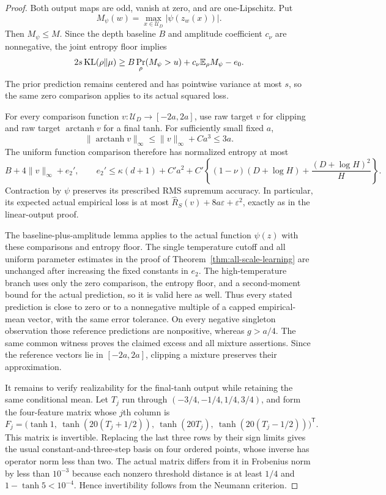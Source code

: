 \begin{proof}
Both output maps are odd, vanish at zero, and are one-Lipschitz. Put
\[
 M_\psi(w)=\max_{x\in\mathcal U_D}|\psi(z_w(x))|.
\]
Then $M_\psi\le M$. Since the depth baseline $B$ and amplitude coefficient $c_\nu$ are nonnegative, the joint entropy floor implies
\[
 2s\operatorname{KL}(\rho\|\mu)
 \ge B\Pr_\rho(M_\psi>u)+c_\nu\mathbb E_\rho M_\psi-e_0.
\]
The prior prediction remains centered and has pointwise variance at most $s$, so the same zero comparison applies to its actual squared loss.

For every comparison function $v:\mathcal U_D\to[-2a,2a]$, use raw target $v$ for clipping and raw target $\operatorname{arctanh}v$ for a final tanh. For sufficiently small fixed $a$,
\[
 \|\operatorname{arctanh}v\|_\infty
       \le\|v\|_\infty+Ca^3\le3a.
\]
The uniform function comparison therefore has normalized entropy at most
\[
 B+4\|v\|_\infty+e_2',\qquad
 e_2'\le\kappa(d+1)+C'a^2+
 C'\left\{(1-\nu)(D+\log H)+\frac{(D+\log H)^2}{H}\right\}.
\]
Contraction by $\psi$ preserves its prescribed RMS supremum accuracy. In particular, its expected actual empirical loss is at most $\widehat R_S(v)+8a\varepsilon+\varepsilon^2$, exactly as in the linear-output proof.

The baseline-plus-amplitude lemma applies to the actual function $\psi(z)$ with these comparisons and entropy floor. The single temperature cutoff and all uniform parameter estimates in the proof of Theorem~\ref{thm:all-scale-learning} are unchanged after increasing the fixed constants in $e_2$. The high-temperature branch uses only the zero comparison, the entropy floor, and a second-moment bound for the actual prediction, so it is valid here as well. Thus every stated prediction is close to zero or to a nonnegative multiple of a capped empirical-mean vector, with the same error tolerance. On every negative singleton observation those reference predictions are nonpositive, whereas $g>a/4$. The same common witness proves the claimed excess and all mixture assertions. Since the reference vectors lie in $[-2a,2a]$, clipping a mixture preserves their approximation.

It remains to verify realizability for the final-tanh output while retaining the same conditional mean. Let $T_j$ run through $(-3/4,-1/4,1/4,3/4)$, and form the four-feature matrix whose $j$th column is
\[
 F_j=\bigl(\tanh1,\ \tanh(20(T_j+1/2)),\
                 \tanh(20T_j),\ \tanh(20(T_j-1/2))\bigr)^{\mathsf T}.
\]
This matrix is invertible. Replacing the last three rows by their sign limits gives the usual constant-and-three-step basis on four ordered points, whose inverse has operator norm less than two. The actual matrix differs from it in Frobenius norm by less than $10^{-3}$ because each nonzero threshold distance is at least $1/4$ and $1-\tanh5<10^{-4}$. Hence invertibility follows from the Neumann criterion.


\end{proof}
